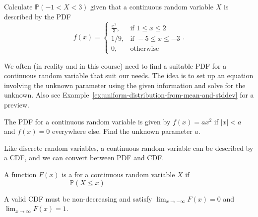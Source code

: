 \documentclass[../main.tex]{subfiles}
\begin{document}
\begin{example}
  Calculate \(\mathbb{P}(-1 < X < 3)\) given that a continuous random variable \(X\) is described by the PDF
  \[
    f(x) = 
    \begin{cases}
      \frac{x^{2}}{3}, & \text{if } 1 \le x \le 2 \\
      1/9, & \text{if } -5 \le x \le -3 \\
      0, &\text{otherwise}
    \end{cases}.
  \]

\end{example}

We often (in reality and in this course) need to find a suitable PDF for a continuous random variable that suit our needs.  The idea is to set up an equation involving the unknown parameter using the given information and solve for the unknown. Also see Example~\ref{ex:uniform-distribution-from-mean-and-stddev} for a preview.
\begin{example} \label{ex:distribution-with-unknown-bounds}
  The PDF for a continuous random variable is given by \(f(x) = a x^{2}\) if \(|x| < a\) and \(f(x) = 0\) everywhere else.  Find the unknown parameter \(a\).

\end{example}
\clearpage

Like discrete random variables, a continuous random variable can be described by a CDF, and we can convert between PDF and CDF. 

\begin{definition}
  A function \(F(x)\) is a  for a continuous random variable \(X\) if
  \[
    \mathbb{P}(X \le x) \hspace{2in}
  \]
\end{definition}

\faStar{} A valid CDF must be non-decreasing and satisfy \(\lim_{x \to -\infty} F(x) = 0\) and \(\lim_{x \to \infty} F(x) = 1\).
\end{document}
